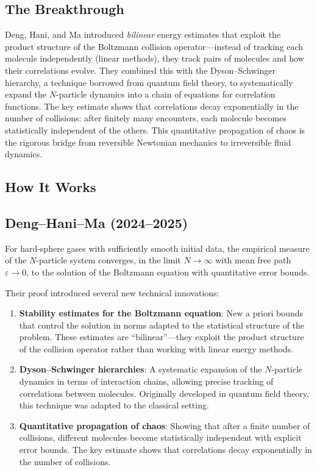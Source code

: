 \subsection{The Breakthrough}
Deng, Hani, and Ma introduced \emph{bilinear} energy estimates that exploit the product structure of the Boltzmann collision operator---instead of tracking each molecule independently (linear methods), they track pairs of molecules and how their correlations evolve. They combined this with the Dyson--Schwinger hierarchy, a technique borrowed from quantum field theory, to systematically expand the $N$-particle dynamics into a chain of equations for correlation functions. The key estimate shows that correlations decay exponentially in the number of collisions: after finitely many encounters, each molecule becomes statistically independent of the others. This quantitative propagation of chaos is the rigorous bridge from reversible Newtonian mechanics to irreversible fluid dynamics.

\subsection{How It Works}

\subsection{Deng--Hani--Ma (2024--2025)}

\begin{theorem}
For hard-sphere gases with sufficiently smooth initial data, the empirical measure of the $N$-particle system converges, in the limit $N \to \infty$ with mean free path $\varepsilon \to 0$, to the solution of the Boltzmann equation with quantitative error bounds.
\end{theorem}

Their proof introduced several new technical innovations:

\begin{enumerate}
\item \textbf{Stability estimates for the Boltzmann equation}: New a priori bounds that control the solution in norms adapted to the statistical structure of the problem. These estimates are ``bilinear''---they exploit the product structure of the collision operator rather than working with linear energy methods.
\item \textbf{Dyson--Schwinger hierarchies}: A systematic expansion of the $N$-particle dynamics in terms of interaction chains, allowing precise tracking of correlations between molecules. Originally developed in quantum field theory, this technique was adapted to the classical setting.
\item \textbf{Quantitative propagation of chaos}: Showing that after a finite number of collisions, different molecules become statistically independent with explicit error bounds. The key estimate shows that correlations decay exponentially in the number of collisions.
\end{enumerate}

